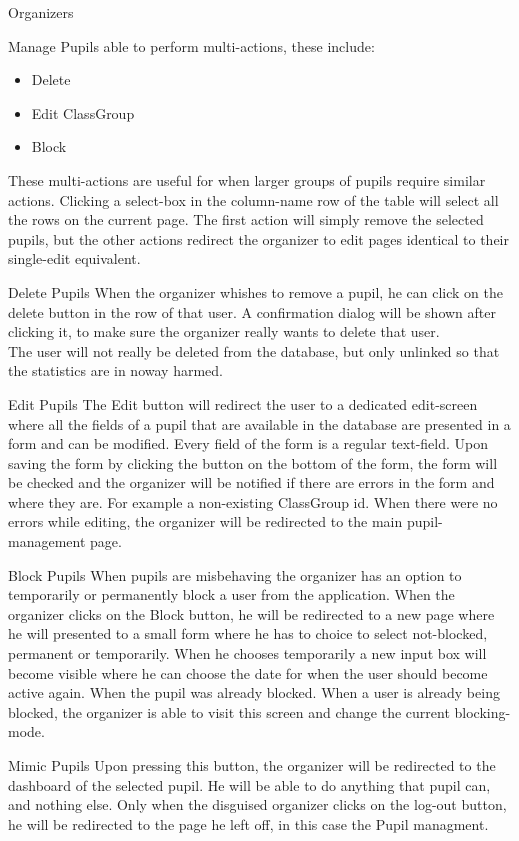 \documentclass[]{article}
\begin{document}
\begin{section}{Organizers}
\begin{subsection}{Manage Pupils}
		able to perform multi-actions, these include:
		\begin{itemize}
			\item Delete
			\item Edit ClassGroup
			\item Block
		\end{itemize}
		These multi-actions are useful for when larger groups of pupils require similar
		actions. Clicking a select-box in the column-name row of the table will select
		all the rows on the current page.
		The first action will simply remove the selected pupils, but the other actions
		redirect the organizer to edit pages identical to their single-edit equivalent.
		\begin{subsubsection}{Delete Pupils}
			When the organizer whishes to remove a pupil, he can click on the delete
			button in the row of that user. A confirmation dialog will be shown after
			clicking it, to make sure the organizer really wants to delete that user. \\
			The user will not really be deleted from the database, but only unlinked so
			that the statistics are in noway harmed.
		\end{subsubsection}
		\begin{subsubsection}{Edit Pupils}
			\label{sec:organizer_edit_pupils}
			The Edit button will redirect the user to a dedicated edit-screen where all
			the fields of a pupil that are available in the database are presented in a
			form and can be modified. Every field of the form is a regular text-field.
			Upon saving the form by clicking the button on the bottom of the form, the
			form will be checked and the organizer will be notified if there are errors
			in the form and where they are. For example a non-existing ClassGroup id.
			When there were no errors while editing, the organizer will be redirected to
			the main pupil-management page.
		\end{subsubsection}
		\begin{subsubsection}{Block Pupils}
			When pupils are misbehaving the organizer has an option to temporarily or
			permanently block a user from the application. When the organizer clicks on
			the Block button, he will be redirected to a new page where he will presented
			to a small form where he has to choice to select not-blocked, permanent or
			temporarily. When he chooses temporarily a new input box will become visible
			where he can choose the date for when the user should become active again.
			When the pupil was already blocked. When a user is already being blocked,
			the organizer is able to visit this screen and change the current
			blocking-mode.
		\end{subsubsection}
		\begin{subsubsection}{Mimic Pupils}
			Upon pressing this button, the organizer will be redirected to the dashboard
			of the selected pupil. He will be able to do anything that pupil can, and
			nothing else. Only when the disguised organizer clicks on the log-out button,
			he will be redirected to the page he left off, in this case the Pupil
			managment.
		\end{subsubsection}
		

\end{subsection}
\end{section}
\end{document}

